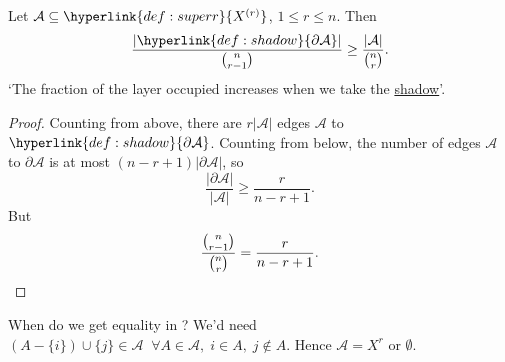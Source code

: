 \documentclass{article}
\begin{document}
\begin{nlemma}\label{thm:locallym2}
  Let $\mathcal{A} \subseteq \hyperlink{def:superr}{X^{(r)}}$, $1 \leq r \leq n$. Then
  \begin{equation*}
    \frac{|\hyperlink{def:shadow}{\partial \mathcal{A}}|}{\binom{n}{r-1}} \geq \frac{|\mathcal{A}|}{\binom{n}{r}}.
  \end{equation*}
  `The fraction of the layer occupied increases when we take the \hyperlink{def:shadow}{shadow}'.
\end{nlemma}
\begin{proof}
  Counting from above, there are $r|\mathcal{A}|$ edges $\mathcal{A}$ to $\hyperlink{def:shadow}{\partial \mathcal{A}}$.
  Counting from below, the number of edges $\mathcal{A}$ to $\partial \mathcal{A}$ is at most $(n-r+1) |\partial \mathcal{A}|$, so
  \begin{equation*}
    \frac{|\partial \mathcal{A}|}{|\mathcal{A}|} \geq \frac{r}{n-r+1}.
  \end{equation*}
  But
  \begin{equation*}
    \frac{\binom{n}{r-1}}{\binom{n}{r}} = \frac{r}{n-r+1}.\qedhere
  \end{equation*}
\end{proof}

When do we get equality in ? We'd need $(A - \{i\}) \cup \{j\} \in \mathcal{A}\;\;\forall A \in \mathcal{A},\; i \in A,\; j \notin A$. Hence $\mathcal{A} = X^{r}$ or $\emptyset$.
\end{document}
